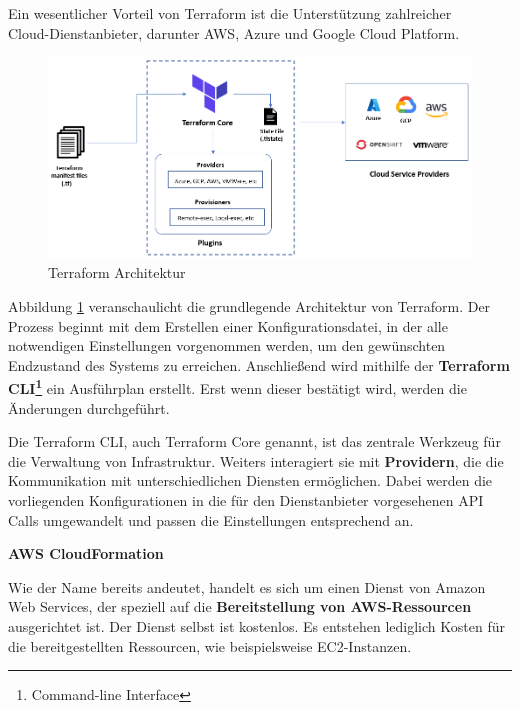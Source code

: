     Ein wesentlicher Vorteil von Terraform ist die Unterstützung zahlreicher \\Cloud-Dienstanbieter, darunter AWS, Azure und Google Cloud Platform. \\ \cite{EA:Web44}
    
    \begin{figure}[H]
        \centering
        \includegraphics[width=1\linewidth]{images/EA/terraform-architecture.png}
        \caption{Terraform Architektur \\ \cite{EA:Web49}}
        \label{fig:terraform-architecture}
    \end{figure}

    Abbildung \ref{fig:terraform-architecture} veranschaulicht die grundlegende Architektur von Terraform.
    Der Prozess beginnt mit dem Erstellen einer Konfigurationsdatei, in der alle notwendigen Einstellungen vorgenommen werden, um den gewünschten Endzustand des Systems zu erreichen. Anschließend wird mithilfe der \textbf{Terraform CLI\footnote{Command-line Interface}} ein Ausführplan erstellt. Erst wenn dieser bestätigt wird, werden die Änderungen durchgeführt.

    Die Terraform CLI, auch Terraform Core genannt, ist das zentrale Werkzeug für die Verwaltung von Infrastruktur.
    Weiters interagiert sie mit \textbf{Providern}, die die Kommunikation mit unterschiedlichen Diensten ermöglichen. Dabei werden die vorliegenden Konfigurationen in die für den Dienstanbieter vorgesehenen API Calls umgewandelt und passen die Einstellungen entsprechend an. \\
    \cite{EA:Web44, EA:Web49}

    \clearpage


    \textbf{AWS CloudFormation}

    Wie der Name bereits andeutet, handelt es sich um einen Dienst von Amazon Web Services, der speziell auf die \textbf{Bereitstellung von AWS-Ressourcen} ausgerichtet ist. Der Dienst selbst ist kostenlos. Es entstehen lediglich Kosten für die bereitgestellten Ressourcen, wie beispielsweise EC2-Instanzen.

